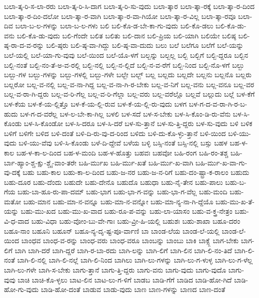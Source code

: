 {ಬಲಾ-ತ್ಕ-ರಿ-ಸ-ಲಾ-ರರು
ಬಲಾ-ತ್ಕ-ರಿ-ಸಿ-ದಾಗ
ಬಲಾ-ತ್ಕ-ರಿ-ಸು-ವುದು
ಬಲಾ-ತ್ಕಾರ
ಬಲಾ-ತ್ಕಾ-ರಕ್ಕೆ
ಬಲಾ-ತ್ಕಾ-ರ-ದಿಂದ
ಬಲಾ-ತ್ಕಾ-ರ-ದಿಂ-ದಲೋ
ಬಲಾ-ತ್ಕಾ-ರ-ವಾಗಿ
ಬಲಾ-ತ್ಕಾ-ರ-ವಾ-ಗಿಯೋ
ಬಲಾ-ತ್ಕಾ-ರ-ವಿಲ್ಲ
ಬಲಾ-ತ್ಕಾ-ರವೂ
ಬಲಾ-ದಿವ
ಬಲಾ-ಬ-ಲ-ಗಳನ್ನು
ಬಲಾ-ಬ-ಲ-ಗಳು
ಬಲಿ
ಬಲಿ-ಕೊ-ಡ-ಬೇ-ಕಾ-ಗು-ವುದು
ಬಲಿ-ಕೊ-ಡಲು
ಬಲಿ-ಕೊ-ಡು-ವನು
ಬಲಿ-ಕೊ-ಡು-ವುದು
ಬಲಿ-ಗೆಂದೇ
ಬಲಿತ
ಬಲಿತು
ಬಲಿ-ದಾನ
ಬಲಿ-ಪ್ರಿಯ
ಬಲಿ-ಯಾಗಿ
ಬಲಿಯೇ
ಬಲಿಷ್ಠ
ಬಲಿ-ಷ್ಠ-ರಾ-ದ-ವ-ರನ್ನು
ಬಲಿ-ಷ್ಠರು
ಬಲಿ-ಷ್ಠ-ವಾ-ಗಿದ್ದು
ಬಲಿ-ಷ್ಠ-ವಾ-ದುದು
ಬಲು
ಬಲೆ
ಬಲೆಗೂ
ಬಲೆಗೆ
ಬಲೆ-ಯನ್ನು
ಬಲೆ-ಯಲ್ಲಿ
ಬಲೆ-ಯಾ-ಗು-ವುವು
ಬಲೆ-ಯಿಂದ
ಬಲೆ-ಯೊ-ಳಗೆ
ಬಲ್ಬನ್ನು
ಬಲ್ಬಲ್ಲ
ಬಲ್ಬಿ
ಬಲ್ಬಿಗೆ
ಬಲ್ಬಿ-ದ್ದರೂ
ಬಲ್ಬಿನ
ಬಲ್ಬಿ-ನಂತೆ
ಬಲ್ಬಿ-ನಂ-ತೆ-ಅ-ವ-ರಲ್ಲಿ
ಬಲ್ಬಿ-ನಲ್ಲಿ
ಬಲ್ಬಿ-ನ-ಲ್ಲಿದೆ
ಬಲ್ಬಿ-ನ-ವ-ರೆಗೆ
ಬಲ್ಬಿ-ನಿಂದ
ಬಲ್ಬಿ-ನೊ-ಳಗೆ
ಬಲ್ಬು
ಬಲ್ಬು-ಗಳ
ಬಲ್ಬು-ಗಳನ್ನು
ಬಲ್ಬು-ಗಳಲ್ಲಿ
ಬಲ್ಬು-ಗಳೇ
ಬಲ್ಬೇ
ಬಲ್ಬ್
ಬಲ್ಲ
ಬಲ್ಲದು
ಬಲ್ಲದೇ
ಬಲ್ಲನು
ಬಲ್ಲನೊ
ಬಲ್ಲರು
ಬಲ್ಲರೋ
ಬಲ್ಲ-ವ-ನಲ್ಲಿ
ಬಲ್ಲ-ವ-ನಾ-ಗಿದ್ದ
ಬಲ್ಲ-ವ-ನಾ-ಗಿ-ರ-ಬೇಕು
ಬಲ್ಲ-ವ-ನಿಗೆ
ಬಲ್ಲ-ವನು
ಬಲ್ಲ-ವನೂ
ಬಲ್ಲ-ವರ
ಬಲ್ಲ-ವ-ರಾ-ಗಿ-ದ್ದರು
ಬಲ್ಲ-ವ-ರಿ-ಗೆಲ್ಲ
ಬಲ್ಲ-ವ-ರಿ-ಗೆಲ್ಲಾ
ಬಲ್ಲ-ವರು
ಬಲ್ಲ-ವರೆಲ್ಲೊ
ಬಲ್ಲವೆ
ಬಲ್ಲುದು
ಬಲ್ಲೆ
ಬಳ-ಕೆಗೆ
ಬಳ-ಕೆಯ
ಬಳ-ಕೆ-ಯ-ಲ್ಲಿತ್ತೊ
ಬಳ-ಕೆ-ಯ-ಲ್ಲಿ-ರುವ
ಬಳ-ಕೆ-ಯ-ಲ್ಲಿ-ರು-ವುದು
ಬಳಗ
ಬಳ-ಗ-ದ-ವ-ರಾ-ಗಿ-ರ-ಬ-ಹುದು
ಬಳ-ಗ-ದ-ವರೆಲ್ಲ
ಬಳ-ಲ-ಬೇ-ಕಾ-ಗಿಲ್ಲ
ಬಳಲಿ
ಬಳ-ಸದೆ
ಬಳ-ಸ-ಬೇಕು
ಬಳ-ಸಿ-ಕೊಂ-ಡಿ-ರು-ವೆನು
ಬಳ-ಸಿ-ಕೊಂಡು
ಬಳ-ಸಿ-ಕೊಂಡೋ
ಬಳ-ಸಿ-ದರೂ
ಬಳ-ಸಿ-ದರೆ
ಬಳ-ಸು-ತ್ತಾನೆ
ಬಳ-ಸು-ತ್ತಿ-ದ್ದರು
ಬಳ-ಸು-ವುದು
ಬಳಿ
ಬಳಿಕ
ಬಳಿಗೆ
ಬಳಿಗೇ
ಬಳಿದ
ಬಳಿ-ದಂತೆ
ಬಳಿ-ದಿ-ರು-ವು-ದ-ರಿಂದ
ಬಳಿದು
ಬಳಿ-ದು-ಕೊ-ಳ್ಳು-ತ್ತಾನೆ
ಬಳಿ-ಯಿಂದ
ಬಳಿ-ಯು-ವುದು
ಬಳಿ-ಯು-ವೆವು
ಬಳಿ-ಸಿ-ಕೊಂಡು
ಬಳೆ-ದಿ-ದ್ದೇವೆ
ಬಳೆಯ
ಬಳ್ಳಿ
ಬಸ್ಸಿ-ನಂತೆ
ಬಸ್ಸಿ-ನಲ್ಲಿ
ಬಸ್ಸು
ಬಹಳ
ಬಹ-ಳ-ಕಾಲ
ಬಹ-ಳ-ಕಾ-ಲ-ದಿಂದ
ಬಹ-ಳ-ಮಂದಿ
ಬಹ-ಳ-ಹೊತ್ತು
ಬಹವಃ
ಬಹವೋ
ಬಹಿ-ರಂಗ
ಬಹಿ-ರಂ-ತಶ್ಚ
ಬಹಿ-ರ್ಬಾ-ಹ್ಯಾಂ-ಶ್ಚ-ಕ್ಷು-ಶ್ಚೈ-ವಾಂ-ತರೇ
ಬಹಿ-ರ್ಮುಖ
ಬಹಿ-ರ್ಮು-ಖತೆ
ಬಹಿ-ರ್ಮು-ಖ-ವಾಗಿ
ಬಹಿ-ರ್ಮು-ಖ-ವಾ-ಗು-ವು-ದಕ್ಕೆ
ಬಹು
ಬಹು-ಕಾಲ
ಬಹು-ಕಾ-ಲ-ದಿಂದ
ಬಹು-ಜ-ನರ
ಬಹು-ಜ-ನ-ರಿಗೆ
ಬಹು-ದಂ-ಷ್ಟ್ರಾ-ಕ-ರಾಲಂ
ಬಹುದು
ಬಹು-ದೂರ
ಬಹು-ದೆಂದು
ಬಹುದೇ
ಬಹು-ದೇನೊ
ಬಹುದೊ
ಬಹುಧಾ
ಬಹು-ನೈ-ತೇನ
ಬಹು-ಪಾಲು
ಬಹು-ಬ-ಗೆಯ
ಬಹು-ಬಾ-ಹೂ-ರು-ಪಾ-ದಮ್
ಬಹು-ಭಾಗ
ಬಹು-ಭಾ-ಗ-ವನ್ನು
ಬಹು-ಭಾ-ಗ-ವೆಲ್ಲ
ಬಹು-ಮಂದಿ
ಬಹು-ಮತೋ
ಬಹು-ಮಾನ
ಬಹು-ಮಾ-ನ-ವನ್ನೂ
ಬಹು-ಮಾ-ನ-ವನ್ನೋ
ಬಹು-ಮಾ-ನ್ಯ-ನಾ-ಗಿ-ದ್ದೆಯೊ
ಬಹು-ಮು-ಖ-ತೆ-ಯನ್ನು
ಬಹು-ಮು-ಖದ
ಬಹು-ಮು-ಖ-ವಾದ
ಬಹು-ರೂ-ಪ-ವನ್ನು
ಬಹು-ಲಾ-ಯಾಸಂ
ಬಹು-ವ-ಕ್ತ್ರ-ನೇತ್ರಂ
ಬಹು-ವಿ-ಧ-ವಾದ
ಬಹು-ವಿಧಾ
ಬಹು-ವೋಂ-ಬು-ವೇ-ಗಾಃ
ಬಹು-ವ್ರೀ-ಹಿ-ಯಲ್ಲಿ
ಬಹುಶಃ
ಬಹು-ಶಾಖಾ
ಬಹೂ-ದರಂ
ಬಹೂ-ನಾಂ
ಬಹೂನಿ
ಬಹೂನ್
ಬಹೂ-ನ್ಯ-ದೃ-ಷ್ಟ-ಪೂ-ರ್ವಾಣಿ
ಬಾ
ಬಾಂಡ-ಲೆಯ
ಬಾಂಡ-ಲೆ-ಯಲ್ಲಿ
ಬಾಂಡ-ಲೆ-ಯಿಂದ
ಬಾಂಧವ
ಬಾಂಧ-ವ-ರನ್ನು
ಬಾಂಧ-ವರು
ಬಾಂಧ-ವರೂ
ಬಾಂಬನ್ನು
ಬಾಂಬು
ಬಾಕಿ
ಬಾಕ್ಸ್ಗೆ
ಬಾಗ-ಬೇಕು
ಬಾಗ-ಲಿಗೆ
ಬಾಗಿ
ಬಾಗಿ-ದರೆ
ಬಾಗಿ-ದ್ದರೆ
ಬಾಗಿ-ರ-ಬಾ-ರದು
ಬಾಗಿ-ಲನ್ನು
ಬಾಗಿ-ಲಿಗೆ
ಬಾಗಿ-ಲಿನ
ಬಾಗಿ-ಲಿ-ನಂ-ತಿದೆ
ಬಾಗಿ-ಲಿ-ನಂತೆ
ಬಾಗಿ-ಲಿ-ನಲ್ಲಿ
ಬಾಗಿ-ಲಿ-ನಲ್ಲೆ
ಬಾಗಿ-ಲಿ-ನಿಂದ
ಬಾಗಿಲು
ಬಾಗಿ-ಲು-ಗಳನ್ನು
ಬಾಗಿ-ಲು-ಗ-ಳುಳ್ಳ
ಬಾಗಿ-ಲು-ಗ-ಳೆಲ್ಲ
ಬಾಗಿ-ಲು-ಗಳೇ
ಬಾಗಿ-ಸ-ಬೇಕು
ಬಾಗು-ತ್ತಾನೆ
ಬಾಗು-ತ್ತಿ-ದ್ದರು
ಬಾಗು-ವನು
ಬಾಗು-ವುದು
ಬಾಗು-ವುದೊ
ಬಾಗು-ವುವು
ಬಾಚಿ
ಬಾಚಿ-ಕೊ-ಳ್ಳಲು
ಬಾಟ-ಲಿನ
ಬಾಟ-ಲು-ಗ-ಳಿಗೆ
ಬಾಡಬ
ಬಾಡಿ-ಗೆಗೆ
ಬಾಡಿದ
ಬಾಡಿ-ಹೋ-ಗಿದೆ
ಬಾಡಿ-ಹೋ-ಗು-ವುದು
ಬಾಡಿ-ಹೋ-ದಂತೆ
ಬಾಡುವ
ಬಾಡು-ವುದು
ಬಾಣ
ಬಾಣ-ಗಳನ್ನು
ಬಾಣದ
ಬಾಣ-ದಂತೆ
}
